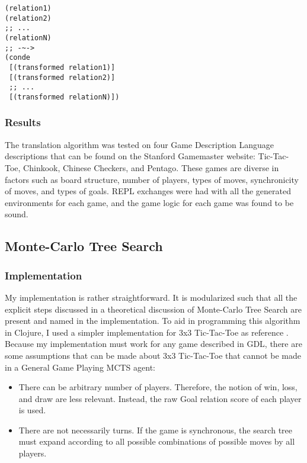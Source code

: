 \documentclass[letterpaper]{article}
\begin{document}
\begin{lstlisting}[frame=single,caption=Multiple related relations are joined by disjunction]
(relation1)
(relation2)
;; ...
(relationN)
;; -~->
(conde
 [(transformed relation1)]
 [(transformed relation2)]
 ;; ...
 [(transformed relationN)])
\end{lstlisting} 


\subsubsection{Results}
The translation algorithm was tested on four Game Description Language descriptions that can be found on the Stanford Gamemaster website: Tic-Tac-Toe, Chinkook, Chinese Checkers, and Pentago. These games are diverse in factors such as board structure, number of players, types of moves, synchronicity of moves, and types of goals. REPL exchanges were had with all the generated environments for each game, and the game logic for each game was found to be sound.

\subsection{Monte-Carlo Tree Search}

\subsubsection{Implementation}
My implementation is rather straightforward. It is modularized such that all the explicit steps discussed in a theoretical discussion of Monte-Carlo Tree Search are present and named in the implementation. To aid in programming this algorithm in Clojure, I used a simpler implementation for 3x3 Tic-Tac-Toe as reference \cite{randomcomp}. Because my implementation must work for any game described in GDL, there are some assumptions that can be made about 3x3 Tic-Tac-Toe that cannot be made in a General Game Playing MCTS agent:
\begin{itemize}
\item There can be arbitrary number of players. Therefore, the notion of win, loss, and draw are less relevant. Instead, the raw Goal relation score of each player is used.
\item There are not necessarily turns. If the game is synchronous, the search tree must expand according to all possible combinations of possible moves by all players.

\end{itemize}
\end{document}
